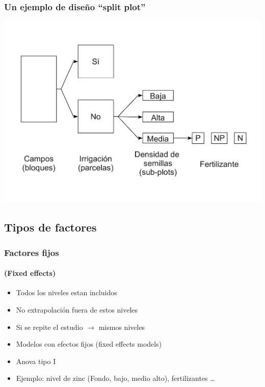 \documentclass[mathserif]{beamer}
\begin{document}
 
\begin{frame}[label=splitploteg]
   \frametitle{Un ejemplo de dise\~no ``split plot''}
   \includegraphics[scale=0.35]{figs/splitplot.pdf}
\end{frame}%


\subsection[Tipos de factores]{Tipos de factores}

\begin{frame}[label=encours]
   \frametitle{Factores fijos}
   \framesubtitle{(Fixed effects)}
   \begin{itemize}
      \item Todos los niveles estan incluidos
      \item No extrapolaci\'on fuera de estos niveles
      \item Si se repite el estudio $\rightarrow$ mismos niveles
      \item Modelos con efectos fijos (fixed effects models)
      \item Anova tipo I
      \item Ejemplo: nivel de zinc (Fondo, bajo, medio alto), fertilizantes \ldots
   \end{itemize}
\end{frame}%
\end{document}
